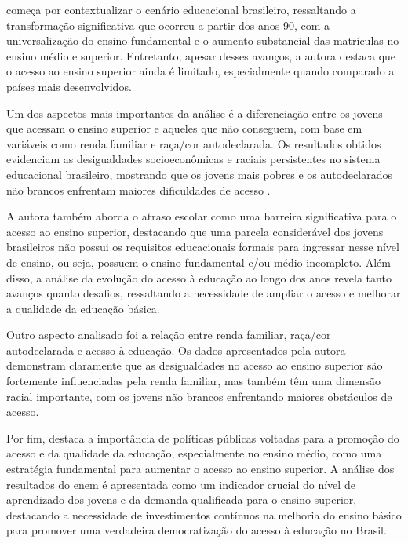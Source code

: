  \cite{de2012acesso} começa por contextualizar o cenário educacional brasileiro, ressaltando a transformação significativa que ocorreu a partir dos anos 90, com a universalização do ensino fundamental e o aumento substancial das matrículas no ensino médio e superior. Entretanto, apesar desses avanços, a autora destaca que o acesso ao ensino superior ainda é limitado, especialmente quando comparado a países mais desenvolvidos.

Um dos aspectos mais importantes da análise é a diferenciação entre os jovens que acessam o ensino superior e aqueles que não conseguem, com base em variáveis como renda familiar e raça/cor autodeclarada. Os resultados obtidos evidenciam as desigualdades socioeconômicas e raciais persistentes no sistema educacional brasileiro, mostrando que os jovens mais pobres e os autodeclarados não brancos enfrentam maiores dificuldades de acesso  \cite{de2012acesso}.

A autora também aborda o atraso escolar como uma barreira significativa para o acesso ao ensino superior, destacando que uma parcela considerável dos jovens brasileiros não possui os requisitos educacionais formais para ingressar nesse nível de ensino, ou seja, possuem o ensino fundamental e/ou médio incompleto. Além disso, a análise da evolução do acesso à educação ao longo dos anos revela tanto avanços quanto desafios, ressaltando a necessidade de ampliar o acesso e melhorar a qualidade da educação básica.

Outro aspecto analisado foi a relação entre renda familiar, raça/cor autodeclarada e acesso à educação. Os dados apresentados pela autora demonstram claramente que as desigualdades no acesso ao ensino superior são fortemente influenciadas pela renda familiar, mas também têm uma dimensão racial importante, com os jovens não brancos enfrentando maiores obstáculos de acesso.

Por fim, \cite{de2012acesso} destaca a importância de políticas públicas voltadas para a promoção do acesso e da qualidade da educação, especialmente no ensino médio, como uma estratégia fundamental para aumentar o acesso ao ensino superior. A análise dos resultados do \ac{enem} é apresentada como um indicador crucial do nível de aprendizado dos jovens e da demanda qualificada para o ensino superior, destacando a necessidade de investimentos contínuos na melhoria do ensino básico para promover uma verdadeira democratização do acesso à educação no Brasil.
